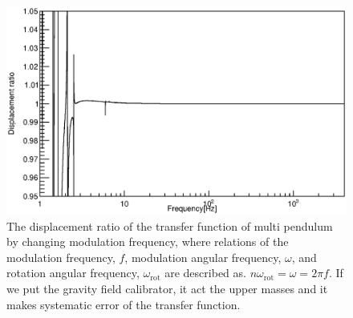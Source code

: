 \documentclass[A4]{spie}  %
\begin{document}
\begin{figure}
\begin{center}
\includegraphics[width=12cm]{dx_Gcal_ratio.eps}
\caption{The displacement ratio of the transfer function of multi pendulum by changing modulation frequency, where relations of the modulation frequency, $f$, modulation angular frequency, $\omega$, and rotation angular frequency, $\omega_{\mathrm{rot}}$ are described as. $n\omega_{\mathrm{rot}}=\omega=2\pi f$. If we put the gravity field calibrator, it act the upper masses and it makes systematic error of the transfer function.}
\label{fig:ratio}
\end{center}
\end{figure}
\end{document}

